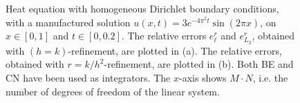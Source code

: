 \begin{figure}
\centering
{}\hspace{0mm}\hspace{0mm}
\caption{Heat equation with homogeneous Dirichlet boundary conditions, with a manufactured solution $u(x,t) = 3 e^{-4 \pi^2 t} \sin{(2 \pi x)}$, on $x \in [0, 1]$ and $t \in [0, 0.2]$. The relative errors $e_\ell^r$ and $e_{L_2}^r$, obtained with $(h = k)$-refinement, are plotted in (a). The relative errors, obtained with $r = k/h^2$-refinement, are plotted in (b). Both BE and CN have been used as integrators. The $x$-axis shows $M \cdot N$, i.e. the number of degrees of freedom of the linear system.}
\end{figure}


